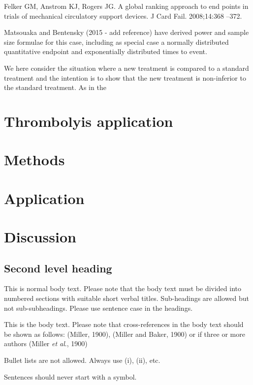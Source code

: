 \documentclass[bimj,fleqn]{w-art}\usepackage[]{graphicx}\usepackage[]{color}
\theoremstyle{plain}
\theoremstyle{definition}
\begin{document}
  Felker GM, Anstrom KJ, Rogers JG. A global ranking approach to end
points in trials of mechanical circulatory support devices. J Card Fail.
2008;14:368 –372.

  Matsouaka and Bentensky (2015 - add reference) have derived power and sample
  size formulae for this case, including as special case a normally distributed
  quantitative endpoint and exponentially distributed times to event.

  We here consider the situation where a new treatment is compared to a standard
  treatment and the intention is to show that the new treatment is non-inferior
  to the standard treatment. As in the


  \section{Thrombolyis application}

  \section{Methods}

  \section{Application}

  \section{Discussion}


  \subsection{Second level heading}
  This is normal body text. Please note that the body text must be divided into numbered sections with
  suitable short verbal titles. Sub-headings are allowed but not sub-subheadings. Please use sentence case in the
  headings.

  This is the body text. Please note that cross-references in the body text should be shown as follows:
  (Miller, 1900), (Miller and Baker, 1900) or if three or more authors (Miller {\it{et al}}., 1900)
  \vspace*{12pt}

  \noindent Bullet lists are not allowed. Always use (i), (ii), etc.
  \vspace*{12pt}

  \noindent Sentences should never start with a symbol.
  \vspace*{12pt}
\end{document}
